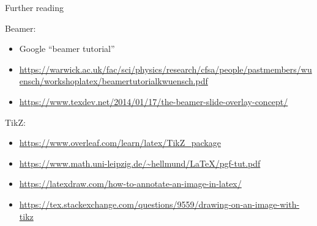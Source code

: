 \documentclass[8pt]{beamer}\usepackage[]{graphicx}\usepackage[]{color}
\begin{document}

\begin{frame}{Further reading}

Beamer:
{\tiny
\begin{itemize}
\item Google ``beamer tutorial''
\item \url{https://warwick.ac.uk/fac/sci/physics/research/cfsa/people/pastmembers/wuensch/workshoplatex/beamertutorialkwuensch.pdf}
\item \url{https://www.texdev.net/2014/01/17/the-beamer-slide-overlay-concept/}\\
\end{itemize}
}

TikZ:
{\tiny
\begin{itemize}
\item \url{https://www.overleaf.com/learn/latex/TikZ_package}
\item \url{https://www.math.uni-leipzig.de/~hellmund/LaTeX/pgf-tut.pdf}
\item \url{https://latexdraw.com/how-to-annotate-an-image-in-latex/}
\item \url{https://tex.stackexchange.com/questions/9559/drawing-on-an-image-with-tikz}
\end{itemize}
}

\end{frame}
\end{document}

